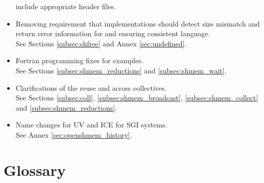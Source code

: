 \begin{itemize}
include appropriate header files. 
%
\item Removing requirement that implementations should detect size mismatch and
return error information for  and ensuring consistent
language.
\\See Sections \ref{subsec:shfree} and Annex \ref{sec:undefined}. 
%
\item Fortran programming fixes for examples.\\ See Sections
\ref{subsec:shmem_reductions} and \ref{subsec:shmem_wait}. 
%
\item Clarifications of the reuse  and  across
collectives.
\\See Sections \ref{subsec:coll}, \ref{subsec:shmem_broadcast},
      \ref{subsec:shmem_collect} and \ref{subsec:shmem_reductions}.
%
\item Name changes for UV and ICE for SGI systems.
\\See Annex \ref{sec:openshmem_history}. 
%
\end{itemize}



\chapter{Glossary}\label{sec:Glossary}

$\;$

